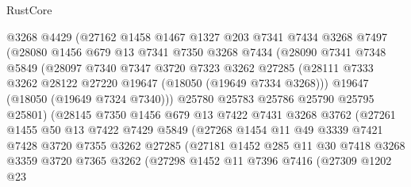 \begin{lexlean}{RustCore}
\begin{coremodule}
                @3268
                @4429
                (@27162
                  @1458
                  @1467
                  @1327
                  @203
                  @7341
                  @7434
                  @3268
                  @7497
                  (@28080
                    @1456
                    @679
                    @13
                    @7341
                    @7350
                    @3268
                    @7434
                    (@28090
                      @7341
                      @7348
                      @5849
                      (@28097
                        @7340
                        @7347
                        @3720
                        @7323
                        @3262
                        @27285
                        (@28111 @7333 @3262 @28122 @27220 @19647 (@18050 (@19649 @7334 @3268)))
                        @19647
                        (@18050 (@19649 @7324 @7340)))
                      @25780
                      @25783
                      @25786
                      @25790
                      @25795
                      @25801)
                    (@28145
                      @7350
                      @1456
                      @679
                      @13
                      @7422
                      @7431
                      @3268
                      @3762
                      (@27261
                        @1455
                        @50
                        @13
                        @7422
                        @7429
                        @5849
                        (@27268
                          @1454
                          @11
                          @49
                          @3339
                          @7421
                          @7428
                          @3720
                          @7355
                          @3262
                          @27285
                          (@27181
                            @1452
                            @285
                            @11
                            @30
                            @7418
                            @3268
                            @3359
                            @3720
                            @7365
                            @3262
                            (@27298
                              @1452
                              @11
                              @7396
                              @7416
                              (@27309
                                @1202
                                @23

\end{coremodule}
\end{lexlean}
